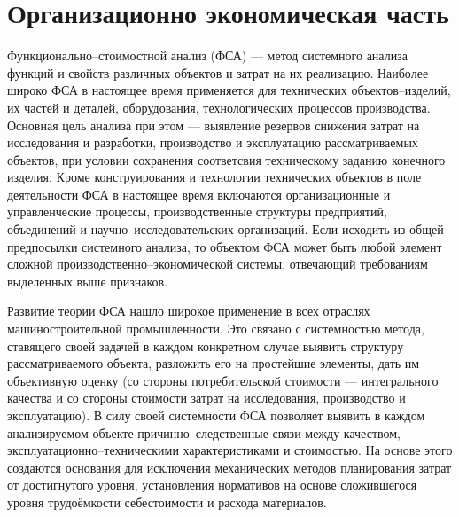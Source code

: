 \section{Организационно экономическая часть}
Функционально--стоимостной анализ (ФСА) --- метод системного
анализа функций и свойств различных объектов и затрат на их
реализацию.
Наиболее широко ФСА в настоящее время применяется для технических
объектов--изделий, их частей и деталей, оборудования, технологических процессов
производства.
Основная цель анализа при этом --- выявление резервов снижения затрат на
исследования и разработки, производство и эксплуатацию рассматриваемых объектов,
при условии сохранения соответсвия техническому заданию конечного изделия.
Кроме конструирования и технологии технических объектов в поле деятельности ФСА
в настоящее время включаются организационные и управленческие процессы,
производственные структуры предприятий, объединений и научно--исследовательских
организаций.
Если исходить из общей предпосылки системного анализа, то объектом ФСА может
быть любой элемент сложной производственно--экономической системы, отвечающий
требованиям выделенных выше признаков.


Развитие теории ФСА нашло широкое применение в всех отраслях машиностроительной
промышленности.
Это связано с системностью метода, ставящего своей задачей в каждом конкретном
случае выявить структуру рассматриваемого объекта, разложить его на простейшие
элементы, дать им объективную оценку (со стороны потребительской стоимости
--- интегрального качества и со стороны стоимости затрат на исследования,
производство и эксплуатацию).
В силу своей системности ФСА позволяет выявить в каждом анализируемом объекте
причинно--следственные связи между качеством, эксплуатационно--техническими
характеристиками и стоимостью.
На основе этого создаются основания для исключения механических методов
планирования затрат от достигнутого уровня, установления нормативов на основе
сложившегося уровня трудоёмкости себестоимости и расхода материалов.


